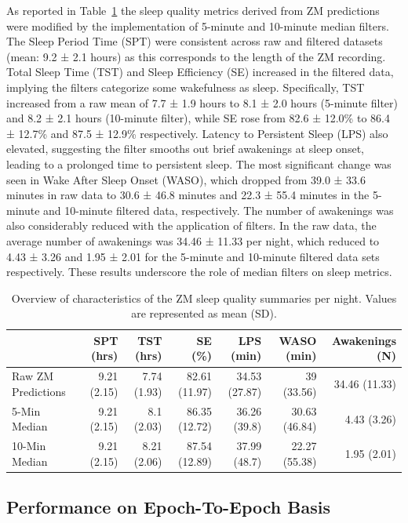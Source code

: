 \documentclass[
  super,
  preprint,
  3p]{elsarticle}
\begin{document}
As reported in Table~\ref{tbl-zm_overview} the sleep quality metrics
derived from ZM predictions were modified by the implementation of
5-minute and 10-minute median filters. The Sleep Period Time (SPT) were
consistent across raw and filtered datasets (mean: 9.2 ± 2.1 hours) as
this corresponds to the length of the ZM recording. Total Sleep Time
(TST) and Sleep Efficiency (SE) increased in the filtered data, implying
the filters categorize some wakefulness as sleep. Specifically, TST
increased from a raw mean of 7.7 ± 1.9 hours to 8.1 ± 2.0 hours
(5-minute filter) and 8.2 ± 2.1 hours (10-minute filter), while SE rose
from 82.6 ± 12.0\% to 86.4 ± 12.7\% and 87.5 ± 12.9\% respectively.
Latency to Persistent Sleep (LPS) also elevated, suggesting the filter
smooths out brief awakenings at sleep onset, leading to a prolonged time
to persistent sleep. The most significant change was seen in Wake After
Sleep Onset (WASO), which dropped from 39.0 ± 33.6 minutes in raw data
to 30.6 ± 46.8 minutes and 22.3 ± 55.4 minutes in the 5-minute and
10-minute filtered data, respectively. The number of awakenings was also
considerably reduced with the application of filters. In the raw data,
the average number of awakenings was 34.46 ± 11.33 per night, which
reduced to 4.43 ± 3.26 and 1.95 ± 2.01 for the 5-minute and 10-minute
filtered data sets respectively. These results underscore the role of
median filters on sleep metrics.

\hypertarget{tbl-zm_overview}{}
\begin{longtable}{lrrrrrr}
\caption{\label{tbl-zm_overview}Overview of characteristics of the ZM sleep quality summaries per night.
Values are represented as mean (SD). }\tabularnewline

\toprule
 & SPT (hrs) & TST (hrs) & SE (\%) & LPS (min) & WASO (min) & Awakenings (N) \\ 
\midrule
Raw ZM Predictions & 9.21 (2.15) & 7.74 (1.93) & 82.61 (11.97) & 34.53 (27.87) & 39 (33.56) & 34.46 (11.33) \\ 
5-Min Median & 9.21 (2.15) & 8.1 (2.03) & 86.35 (12.72) & 36.26 (39.8) & 30.63 (46.84) & 4.43 (3.26) \\ 
10-Min Median & 9.21 (2.15) & 8.21 (2.06) & 87.54 (12.89) & 37.99 (48.7) & 22.27 (55.38) & 1.95 (2.01) \\ 
\bottomrule
\end{longtable}

\hypertarget{performance-on-epoch-to-epoch-basis}{%
\subsection{Performance on Epoch-To-Epoch
Basis}\label{performance-on-epoch-to-epoch-basis}}
\end{document}
